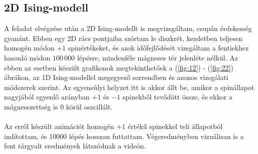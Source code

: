 \subsection{2D Ising-modell}
A feladat elvégzése után a 2D Ising-modellt is megvizsgáltam, csupán érdekesség gyanánt. Ebben egy 2D rács pontjaiba szórtam le diszkrét, kezdetben teljesen homogén módon $+1$ spinértékeket, és azok időfejlődését vizsgáltam a fentiekhez hasonló módon $100\,000$ lépésre, mindenféle mágneses tér jelenléte nélkül. Az ebben az esetben készült grafikonok megtekinthetőek a (\ref{fig:12}) - (\ref{fig:22}) ábrákon, az 1D Ising-modellel megegyező sorrendben és azonos vizsgálati módszerek szerint. Az egyensúlyi helyzet itt is akkor állt be, amikor a spinállapot nagyjából egyenlő arányban $+1$ és $-1$ spinekből tevődött össze, és ekkor a mágnesezettség is $0$ körül oszcillált.
\\ \\
Az erről készült animációt\cite{yt} homogén $+1$ értékű spinekkel teli állapotból indítottam, és $10000$ lépés hosszan futtattam. Végeredményben vizuálisan is a fent tárgyalt eredmények látszódnak a videón.